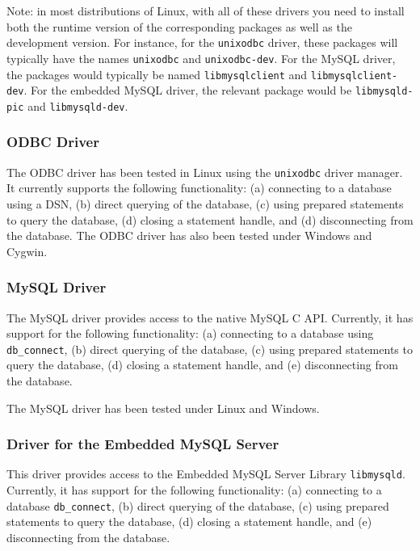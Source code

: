Note: in most distributions of Linux,
with all of these drivers you need to install both the runtime
version of the corresponding packages as well as the development version.
For instance, for the \texttt{unixodbc} driver, these packages will
typically have the names \texttt{unixodbc} and \texttt{unixodbc-dev}.
For the MySQL driver, the packages would typically be named
\texttt{libmysqlclient} and \texttt{libmysqlclient-dev}.  
For the embedded MySQL driver, the relevant package would be
\texttt{libmysqld-pic} and 
\texttt{libmysqld-dev}. 

\subsubsection{ODBC Driver}

The ODBC driver has been tested in Linux using the {\tt unixodbc} driver
manager.  It currently supports the following functionality: (a)
connecting to a database using a DSN, (b) direct querying of the database,
(c) using prepared statements to query the database, (d) closing a
statement handle, and (d) disconnecting from the database.
The ODBC driver has also been tested under Windows and Cygwin.


\subsubsection{MySQL Driver}

The MySQL driver provides access to the native MySQL C API.
Currently, it has support for the following functionality: (a) connecting
to a database using {\tt db\_connect}, (b) direct querying of
the database, (c) using prepared statements to query the database, (d) closing a
statement handle, and (e) disconnecting from the database.

The MySQL driver has been tested under Linux and Windows.


\subsubsection{Driver for the Embedded MySQL Server}

This driver provides access to the Embedded MySQL Server Library {\tt libmysqld}. Currently, it has support for the following functionality: (a) connecting
to a database {\tt db\_connect}, (b) direct querying of
the database, (c) using prepared statements to query the database, (d) closing a
statement handle, and (e) disconnecting from the database.

